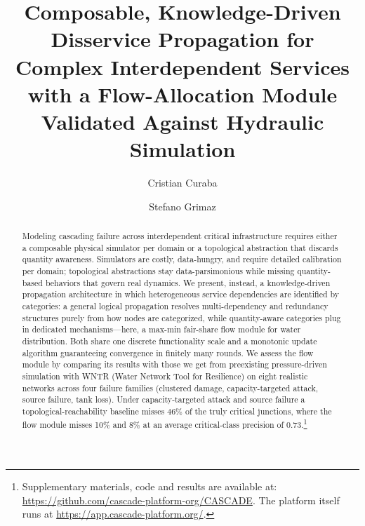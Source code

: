 \documentclass{svproc}
\begin{document}
\mainmatter 

\title{Composable, Knowledge-Driven Disservice Propagation for Complex Interdependent Services with a Flow-Allocation Module Validated Against Hydraulic Simulation}


\author{Cristian Curaba \and Stefano Grimaz}

\maketitle

\begin{abstract}
Modeling cascading failure across interdependent critical infrastructure requires either
a composable physical simulator per domain or a topological abstraction that discards
quantity awareness. Simulators are costly, data-hungry, and require detailed calibration per domain; topological
abstractions stay data-parsimonious while missing quantity-based behaviors that govern real dynamics. 
We present, instead, a knowledge-driven propagation architecture in which heterogeneous
service dependencies are identified by categories: a general logical propagation resolves
multi-dependency and redundancy structures purely from how nodes are categorized, while
quantity-aware categories plug in dedicated mechanisms---here, a max-min fair-share flow
module for water distribution. Both share one discrete functionality scale and a
monotonic update algorithm guaranteeing convergence in finitely many rounds. 
We assess the flow module by comparing its results with those we get from preexisting
pressure-driven simulation with WNTR (Water Network Tool for Resilience) on eight realistic networks across four failure families (clustered damage, capacity-targeted attack, source failure,
tank loss). Under capacity-targeted attack and source failure a topological-reachability baseline misses
46\% of the truly critical junctions, where the flow module misses 10\% and 8\% at an average critical-class precision of
0.73.\footnote{Supplementary materials, code and results are available at:
\url{https://github.com/cascade-platform-org/CASCADE}. The platform itself runs at \url{https://app.cascade-platform.org/}.}
\end{abstract}
\end{document}
